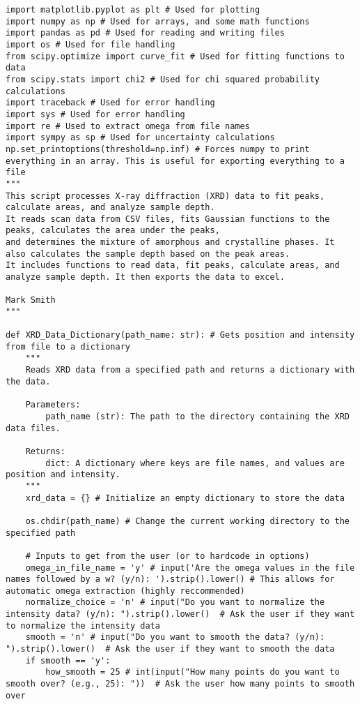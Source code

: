 \begin{small}
    \begingroup
    \makeatletter
    \@totalleftmargin=-1cm
	\begin{verbatim}
import matplotlib.pyplot as plt # Used for plotting
import numpy as np # Used for arrays, and some math functions
import pandas as pd # Used for reading and writing files
import os # Used for file handling
from scipy.optimize import curve_fit # Used for fitting functions to data
from scipy.stats import chi2 # Used for chi squared probability calculations
import traceback # Used for error handling
import sys # Used for error handling
import re # Used to extract omega from file names
import sympy as sp # Used for uncertainty calculations
np.set_printoptions(threshold=np.inf) # Forces numpy to print everything in an array. This is useful for exporting everything to a file
"""
This script processes X-ray diffraction (XRD) data to fit peaks, calculate areas, and analyze sample depth.
It reads scan data from CSV files, fits Gaussian functions to the peaks, calculates the area under the peaks,
and determines the mixture of amorphous and crystalline phases. It also calculates the sample depth based on the peak areas.
It includes functions to read data, fit peaks, calculate areas, and analyze sample depth. It then exports the data to excel.

Mark Smith
"""

def XRD_Data_Dictionary(path_name: str): # Gets position and intensity from file to a dictionary
    """
    Reads XRD data from a specified path and returns a dictionary with the data.

    Parameters:
        path_name (str): The path to the directory containing the XRD data files.

    Returns:
        dict: A dictionary where keys are file names, and values are position and intensity.
    """
    xrd_data = {} # Initialize an empty dictionary to store the data

    os.chdir(path_name) # Change the current working directory to the specified path
    
    # Inputs to get from the user (or to hardcode in options)
    omega_in_file_name = 'y' # input('Are the omega values in the file names followed by a w? (y/n): ').strip().lower() # This allows for automatic omega extraction (highly reccommended)
    normalize_choice = 'n' # input("Do you want to normalize the intensity data? (y/n): ").strip().lower()  # Ask the user if they want to normalize the intensity data
    smooth = 'n' # input("Do you want to smooth the data? (y/n): ").strip().lower()  # Ask the user if they want to smooth the data
    if smooth == 'y':
        how_smooth = 25 # int(input("How many points do you want to smooth over? (e.g., 25): "))  # Ask the user how many points to smooth over
    

\end{verbatim}
\end{small}
